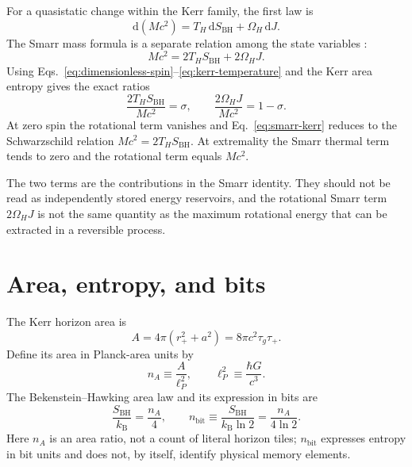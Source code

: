 \documentclass[12pt]{article}
\begin{document}
For a quasistatic change within the Kerr family, the first law is
\begin{equation}
  \mathrm{d}(Mc^2)=T_H\,\mathrm{d}S_{\mathrm{BH}}+\Omega_H\,\mathrm{d}J.
  \label{eq:first-law}
\end{equation}
The Smarr mass formula is a separate relation among the state variables \cite{Smarr}:
\begin{equation}
  Mc^2=2T_HS_{\mathrm{BH}}+2\Omega_HJ.
  \label{eq:smarr-kerr}
\end{equation}
Using Eqs.~\eqref{eq:dimensionless-spin}--\eqref{eq:kerr-temperature} and the Kerr area entropy gives the exact ratios
\begin{equation}
  \frac{2T_HS_{\mathrm{BH}}}{Mc^2}=\sigma,
  \qquad
  \frac{2\Omega_HJ}{Mc^2}=1-\sigma.
  \label{eq:smarr-fractions}
\end{equation}
At zero spin the rotational term vanishes and Eq.~\eqref{eq:smarr-kerr} reduces to the Schwarzschild relation $Mc^2=2T_HS_{\mathrm{BH}}$. At extremality the Smarr thermal term tends to zero and the rotational term equals $Mc^2$.

The two terms are the contributions in the Smarr identity. They should not be read as independently stored energy reservoirs, and the rotational Smarr term $2\Omega_HJ$ is not the same quantity as the maximum rotational energy that can be extracted in a reversible process.

\section{Area, entropy, and bits}

The Kerr horizon area is
\begin{equation}
  A=4\pi(r_+^2+a^2)
  =8\pi c^2\tau_g\tau_+.
  \label{eq:kerr-area}
\end{equation}
Define its area in Planck-area units by
\begin{equation}
  n_A\equiv\frac{A}{\ell_P^2},
  \qquad
  \ell_P^2\equiv\frac{\hbar G}{c^3}.
  \label{eq:area-count}
\end{equation}
The Bekenstein--Hawking area law and its expression in bits are \cite{Bekenstein}
\begin{equation}
  \frac{S_{\mathrm{BH}}}{k_{\mathrm B}}=\frac{n_A}{4},
  \qquad
  n_{\mathrm{bit}}\equiv\frac{S_{\mathrm{BH}}}{k_{\mathrm B}\ln2}
  =\frac{n_A}{4\ln2}.
  \label{eq:entropy-counts}
\end{equation}
Here $n_A$ is an area ratio, not a count of literal horizon tiles; $n_{\mathrm{bit}}$ expresses entropy in bit units and does not, by itself, identify physical memory elements.
\end{document}
